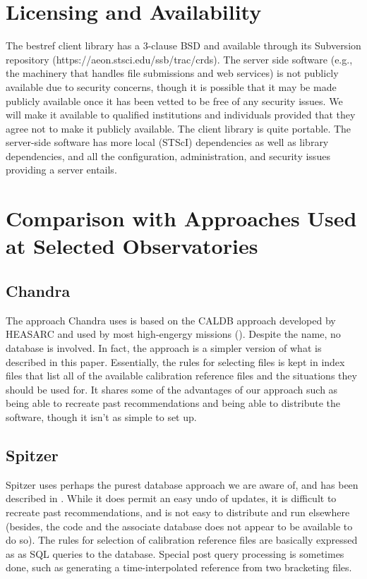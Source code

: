 \documentclass[final,authoryear,5p,times,twocolumn]{elsarticle}
\begin{document}
\section{Licensing and Availability}

The bestref client library has a 3-clause BSD and available through its
Subversion repository (https://aeon.stsci.edu/ssb/trac/crds). 
The server side software (e.g., the machinery that handles
file submissions and web services) is not publicly available due to security
concerns, though it is possible that it may be made publicly available once it
has been vetted to be free of any security issues. We will make it available to
qualified institutions and individuals provided that they agree not to make it
publicly available. The client library is quite portable. The server-side
software has more local (STScI) dependencies as well as library dependencies,
and all the configuration, administration, and security issues providing a
server entails.

\section{Comparison with Approaches Used at Selected Observatories}

\subsection{Chandra}

The approach Chandra uses is based on the CALDB approach developed by 
HEASARC and used by most high-engergy missions 
(\citealt{2006SPIE.6270E..1XG}). Despite
the name, no database is involved. In fact, the approach is a simpler 
version of what is described in this paper. Essentially, the rules for 
selecting files is kept in index files that list all of the available 
calibration reference files and the situations they should be used for. 
It shares some of the advantages of our approach such as being able to 
recreate past recommendations and being able to distribute the software, 
though it isn’t as simple to set up. 

\subsection{Spitzer}

Spitzer uses perhaps the purest database approach we are aware of, and 
has been described in \citealt{2005ASPC..347..594L}. 
While it does permit an easy undo of updates, 
it is difficult to recreate past recommendations, and is not easy to 
distribute and run elsewhere (besides, the code and the associate 
database does not appear to be available to do so).
The rules for selection of calibration reference 
files are basically expressed as as SQL queries to the database.
Special post query processing is sometimes done, such as generating
a time-interpolated reference from two bracketing files.
\end{document}
